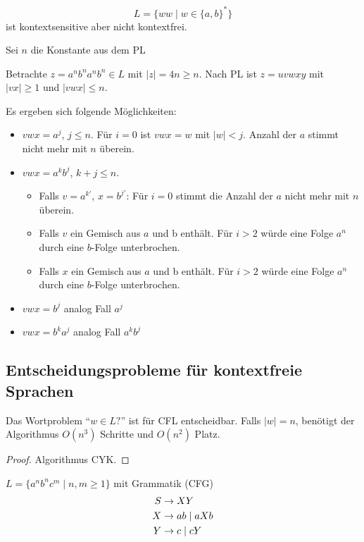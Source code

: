 \begin{Bsp}
  \begin{displaymath}
    L = \{ww \mid w \in \{a,b\}^*\}
  \end{displaymath}
  ist kontextsensitive aber nicht kontextfrei.

  Sei $n$ die Konstante aus dem PL

  Betrachte $z = a^nb^na^nb^n \in L$ mit $|z| = 4n \ge n$.
  Nach PL ist $z = uvwxy$ mit $|vx| \ge 1$ und $|vwx| \le n$.

  Es ergeben sich folgende Möglichkeiten:
  \begin{itemize}
  \item $vwx = a^j$, $j \le n$.
    Für $i=0$ ist $vwx=w$ mit $|w| < j$.
    Anzahl der $a$ stimmt nicht mehr mit $n$ überein.
  \item $vwx = a^kb^j$, $k+j \le n$.

    \begin{itemize}
    \item Falls $v = a^{k'}$, $x = b^{j'}$: Für $i=0$ stimmt die Anzahl der $a$ nicht mehr mit $n$ überein.
    \item Falls $v$ ein Gemisch aus $a$ und b enthält.
      Für $i>2$ würde eine Folge $a^n$ durch eine $b$-Folge unterbrochen.
    \item Falls $x$ ein Gemisch aus $a$ und b enthält.
      Für $i>2$ würde eine Folge $a^n$ durch eine $b$-Folge unterbrochen.
    \end{itemize}
  \item $vwx = b^j$ analog Fall $a^j$
  \item $vwx = b^ka^j$ analog Fall $a^kb^j$
  \end{itemize}
\end{Bsp}

\subsection{Entscheidungsprobleme für kontextfreie Sprachen}
\begin{Satz}[name={[Wortproblem für \acs*{CFL} entscheidbar]}]
	Das Wortproblem "`$w\in L?$"' ist für \ac{CFL} entscheidbar. Falls $|w|=n$, benötigt der Algorithmus $O(n^3)$ Schritte und $O(n^2)$ Platz.
\end{Satz}
\begin{proof}
	Algorithmus \ac{CYK}.
\end{proof}
\begin{Bsp}
	$L=\{a^nb^nc^m \mid n,m\geq 1\}$ mit Grammatik (\acs{CFG})
	\begin{align*}
		S &\-> XY\\
		X &\-> ab \mid aXb\\
		Y &\-> c \mid cY
	\end{align*}
\end{Bsp}

